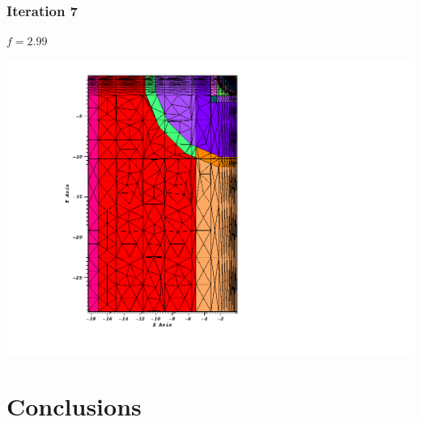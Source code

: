 \documentclass[]{beamer}
\begin{document}
\begin{frame}[t]\frametitle{Iteration 7}
\begin{minipage}{0.15\textwidth}
\begin{footnotesize}
$f = 2.99$
\end{footnotesize}
\end{minipage}
\begin{minipage}{0.8\textwidth}
\centering
\includegraphics[scale=0.3]{figures/IM1_post_iterations0000.png}
\end{minipage}
\end{frame}


\section{Conclusions}
\subsection{}
\end{document}

